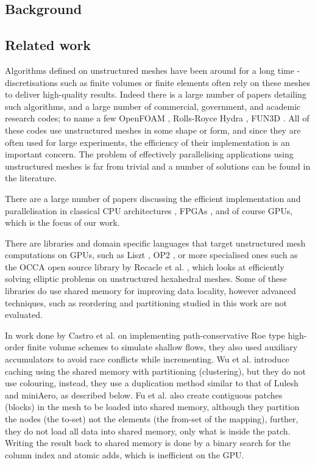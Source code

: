 \subsection{Background}\label{sec:background}


\subsection{Related work}\label{related-works}

Algorithms defined on unstructured meshes have been around for a long time -
discretisations such as finite volumes or finite elements often rely on these
meshes to deliver high-quality results. Indeed there is a large number of papers
detailing such algorithms, and a large number of commercial, government, and
academic research codes; to name a few OpenFOAM \cite{OpenFoamUserGuide},
Rolls-Royce Hydra \cite{moinier2002edge}, FUN3D \cite{biedron2017fun3d}. All of
these codes use unstructured meshes in some shape or form, and since they are
often used for large experiments, the efficiency of their implementation is  an
important concern. The problem of effectively parallelising applications using
unstructured meshes is far from trivial and a number of solutions can be found
in the literature.

There are a large number of papers discussing the efficient implementation and
parallelisation in classical CPU architectures
\cite{mavriplis2002parallel,jin1999openmp}, FPGAs
\cite{nagy2014accelerating,akamine2012reconfigurable}, and of course GPUs,
which is the focus of our work.

There are libraries and domain specific languages that target unstructured mesh
computations on GPUs, such as Liszt \cite{devito2011liszt}, OP2
\cite{giles2012op2}, or more specialised ones such as the OCCA\cite{libocca}
open source library by Recacle et al. \cite{remacle2016gpu}, which looks at
efficiently solving elliptic problems on unstructured hexahedral meshes. Some
of these libraries do use shared memory for improving data locality, however
advanced techniques, such as reordering and partitioning studied in this work
are not evaluated. 

In work done by Castro et al. \cite{shallow_water} on implementing
path-conservative Roe type high-order finite volume schemes to simulate shallow
flows, they also used auxiliary accumulators to avoid race conflicts while
incrementing. Wu et al. \cite{wu2013complexity} introduce caching using the
shared memory with partitioning (clustering), but they do not use colouring,
instead, they use a duplication method similar to that of Lulesh and miniAero,
as described below. Fu et al. \cite{fu2014architecting} also create contiguous
patches (blocks) in the mesh to be loaded into shared memory, although they
partition the nodes (the to-set) not the elements (the from-set of the
mapping), further, they do not load all data into shared memory, only what is
inside the patch. Writing the result back to shared memory is done by a binary
search for the column index and atomic adds, which is inefficient on the GPU. 

